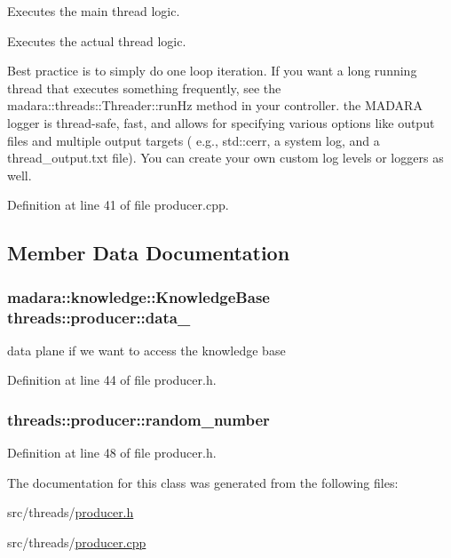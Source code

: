 Executes the main thread logic. 

Executes the actual thread logic.

Best practice is to simply do one loop iteration. If you want a long running thread that executes something frequently, see the madara\+::threads\+::\+Threader\+::run\+Hz method in your controller. the M\+A\+D\+A\+RA logger is thread-\/safe, fast, and allows for specifying various options like output files and multiple output targets ( e.\+g., std\+::cerr, a system log, and a thread\+\_\+output.\+txt file). You can create your own custom log levels or loggers as well.

Definition at line 41 of file producer.\+cpp.



\subsection{Member Data Documentation}
\subsubsection[{\texorpdfstring{data\+\_\+}{data_}}]{\setlength{\rightskip}{0pt plus 5cm}madara\+::knowledge\+::\+Knowledge\+Base threads\+::producer\+::data\+\_\+\hspace{0.3cm}{\ttfamily [private]}}\hypertarget{classthreads_1_1producer_a9cd75e08b351b2e4e13f3d5b3b4d9e67}{}\label{classthreads_1_1producer_a9cd75e08b351b2e4e13f3d5b3b4d9e67}


data plane if we want to access the knowledge base 



Definition at line 44 of file producer.\+h.

\subsubsection[{\texorpdfstring{random\+\_\+number}{random_number}}]{ threads\+::producer\+::random\+\_\+number\hspace{0.3cm}{\ttfamily [protected]}}\hypertarget{classthreads_1_1producer_a5ca9ba785a3f49123aea07f960e5497d}{}\label{classthreads_1_1producer_a5ca9ba785a3f49123aea07f960e5497d}


Definition at line 48 of file producer.\+h.



The documentation for this class was generated from the following files\+:\begin{DoxyCompactItemize}
\item 
src/threads/\hyperlink{producer_8h}{producer.\+h}\item 
src/threads/\hyperlink{producer_8cpp}{producer.\+cpp}\end{DoxyCompactItemize}
